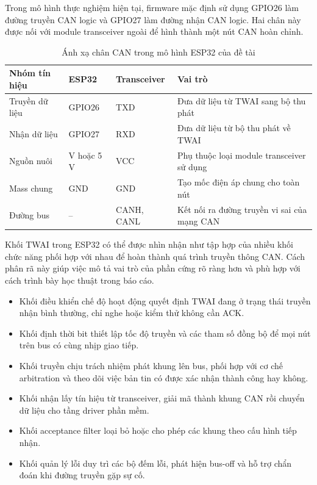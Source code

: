 Trong mô hình thực nghiệm hiện tại, firmware mặc định sử dụng GPIO26 làm đường truyền
CAN logic và GPIO27 làm đường nhận CAN logic. Hai chân này được nối với module
transceiver ngoài để hình thành một nút CAN hoàn chỉnh.

\begin{table}[H]
\centering
\begin{tabular}{|>{\raggedright\arraybackslash}p{3.2cm}|>{\raggedright\arraybackslash}p{2.4cm}|>{\raggedright\arraybackslash}p{3.2cm}|>{\raggedright\arraybackslash}p{4.2cm}|}
\hline
\textbf{Nhóm tín hiệu} & \textbf{ESP32} & \textbf{Transceiver} & \textbf{Vai trò} \\ \hline
Truyền dữ liệu & GPIO26 & TXD & Đưa dữ liệu từ TWAI sang bộ thu phát \\ \hline
Nhận dữ liệu & GPIO27 & RXD & Đưa dữ liệu từ bộ thu phát về TWAI \\ \hline
Nguồn nuôi & 3.3 V hoặc 5 V & VCC & Phụ thuộc loại module transceiver sử dụng \\ \hline
Mass chung & GND & GND & Tạo mốc điện áp chung cho toàn nút \\ \hline
Đường bus & -- & CANH, CANL & Kết nối ra đường truyền vi sai của mạng CAN \\ \hline
\end{tabular}
\caption{Ánh xạ chân CAN trong mô hình ESP32 của đề tài}
\end{table}


Khối TWAI trong ESP32 có thể được nhìn nhận như tập hợp của nhiều khối chức năng phối
hợp với nhau để hoàn thành quá trình truyền thông CAN. Cách phân rã này giúp việc mô tả
vai trò của phần cứng rõ ràng hơn và phù hợp với cách trình bày học thuật trong báo cáo.


\begin{itemize}[leftmargin=1.5cm, itemsep=0.6em]
    \item Khối điều khiển chế độ hoạt động quyết định TWAI đang ở trạng thái truyền nhận
    bình thường, chỉ nghe hoặc kiểm thử không cần ACK.
    \item Khối định thời bit thiết lập tốc độ truyền và các tham số đồng bộ để mọi nút trên
    bus có cùng nhịp giao tiếp.
    \item Khối truyền chịu trách nhiệm phát khung lên bus, phối hợp với cơ chế arbitration
    và theo dõi việc bản tin có được xác nhận thành công hay không.
    \item Khối nhận lấy tín hiệu từ transceiver, giải mã thành khung CAN rồi chuyển dữ liệu
    cho tầng driver phần mềm.
    \item Khối acceptance filter loại bỏ hoặc cho phép các khung theo cấu hình tiếp nhận.
    \item Khối quản lý lỗi duy trì các bộ đếm lỗi, phát hiện bus-off và hỗ trợ chẩn đoán khi
    đường truyền gặp sự cố.
\end{itemize}


